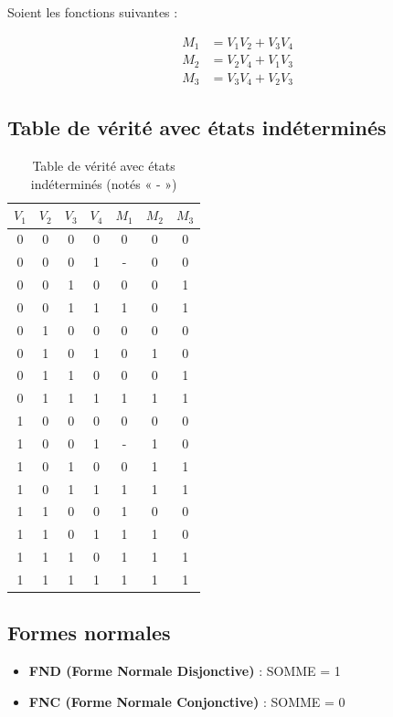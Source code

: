 \documentclass[a4paper,12pt]{article}
\begin{document}
Soient les fonctions suivantes :

\begin{align}
M_1 &= V_1 V_2 + V_3 V_4 \\
M_2 &= V_2 V_4 + V_1 V_3 \\
M_3 &= V_3 V_4 + V_2 V_3
\end{align}

\subsection{Table de vérité avec états indéterminés}

\begin{table}[h]
\centering
\begin{tabular}{cccc|ccc}
\toprule
$V_1$ & $V_2$ & $V_3$ & $V_4$ & $M_1$ & $M_2$ & $M_3$ \\
\midrule
0 & 0 & 0 & 0 & 0 & 0 & 0 \\
0 & 0 & 0 & 1 & - & 0 & 0 \\
0 & 0 & 1 & 0 & 0 & 0 & 1 \\
0 & 0 & 1 & 1 & 1 & 0 & 1 \\
0 & 1 & 0 & 0 & 0 & 0 & 0 \\
0 & 1 & 0 & 1 & 0 & 1 & 0 \\
0 & 1 & 1 & 0 & 0 & 0 & 1 \\
0 & 1 & 1 & 1 & 1 & 1 & 1 \\
1 & 0 & 0 & 0 & 0 & 0 & 0 \\
1 & 0 & 0 & 1 & - & 1 & 0 \\
1 & 0 & 1 & 0 & 0 & 1 & 1 \\
1 & 0 & 1 & 1 & 1 & 1 & 1 \\
1 & 1 & 0 & 0 & 1 & 0 & 0 \\
1 & 1 & 0 & 1 & 1 & 1 & 0 \\
1 & 1 & 1 & 0 & 1 & 1 & 1 \\
1 & 1 & 1 & 1 & 1 & 1 & 1 \\
\bottomrule
\end{tabular}
\caption{Table de vérité avec états indéterminés (notés « - »)}
\end{table}

\subsection{Formes normales}

\begin{itemize}
    \item \textbf{FND (Forme Normale Disjonctive)} : SOMME = 1
    \item \textbf{FNC (Forme Normale Conjonctive)} : SOMME = 0
\end{itemize}
\end{document}
